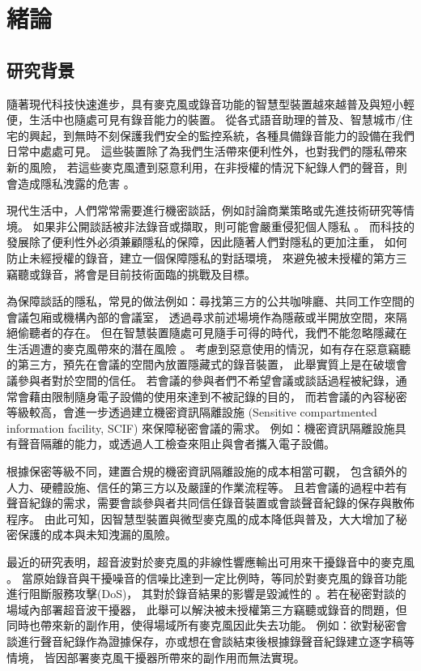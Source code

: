 \chapter{緒論}\label{chapter:intro}

\section{研究背景}\label{section:intro-background}

    隨著現代科技快速進步，具有麥克風或錄音功能的智慧型裝置越來越普及與短小輕便，生活中也隨處可見有錄音能力的裝置。
從各式語音助理的普及、智慧城市/住宅的興起，到無時不刻保護我們安全的監控系統，各種具備錄音能力的設備在我們日常中處處可見。
這些裝置除了為我們生活帶來便利性外，也對我們的隱私帶來新的風險，
若這些麥克風遭到惡意利用，在非授權的情況下紀錄人們的聲音，則會造成隱私洩露的危害 \cite{song2017poster}。

    現代生活中，人們常常需要進行機密談話，例如討論商業策略或先進技術研究等情境。
如果非公開談話被非法錄音或擷取，則可能會嚴重侵犯個人隱私 \cite{chung2017alexa}。
而科技的發展除了便利性外必須兼顧隱私的保障，因此隨著人們對隱私的更加注重，
如何防止未經授權的錄音，建立一個保障隱私的對話環境，
來避免被未授權的第方三竊聽或錄音，將會是目前技術面臨的挑戰及目標。

    為保障談話的隱私，常見的做法例如：尋找第三方的公共咖啡廳、共同工作空間的會議包廂或機構內部的會議室，
透過尋求前述場境作為隱蔽或半開放空間，來隔絕偷聽者的存在。
但在智慧裝置隨處可見隨手可得的時代，我們不能忽略隱藏在生活週遭的麥克風帶來的潛在風險 \cite{mao2020watchdog}。
考慮到惡意使用的情況，如有存在惡意竊聽的第三方，預先在會議的空間內放置隱藏式的錄音裝置，
此舉實質上是在破壞會議參與者對於空間的信任。
若會議的參與者們不希望會議或談話過程被紀錄，通常會藉由限制隨身電子設備的使用來達到不被記錄的目的，
而若會議的內容秘密等級較高，會進一步透過建立機密資訊隔離設施
(Sensitive compartmented information facility, SCIF) 來保障秘密會議的需求。
例如：機密資訊隔離設施具有聲音隔離的能力，或透過人工檢查來阻止與會者攜入電子設備。

    根據保密等級不同，建置合規的機密資訊隔離設施的成本相當可觀，
包含額外的人力、硬體設施、信任的第三方以及嚴謹的作業流程等。
且若會議的過程中若有聲音紀錄的需求，需要會談參與者共同信任錄音裝置或會談聲音紀錄的保存與散佈程序。
由此可知，因智慧型裝置與微型麥克風的成本降低與普及，大大增加了秘密保護的成本與未知洩漏的風險。

    最近的研究表明，超音波對於麥克風的非線性響應輸出可用來干擾錄音中的麥克風 \cite{chen2019understanding}。
當原始錄音與干擾噪音的信噪比達到一定比例時，等同於對麥克風的錄音功能進行阻斷服務攻擊(DoS)，
其對於錄音結果的影響是毀滅性的 \cite{zhang2017dolphinattack}。若在秘密對談的場域內部署超音波干擾器，
此舉可以解決被未授權第三方竊聽或錄音的問題，但同時也帶來新的副作用，使得場域所有麥克風因此失去功能。
例如：欲對秘密會談進行聲音紀錄作為證據保存，亦或想在會談結束後根據錄聲音紀錄建立逐字稿等情境，
皆因部署麥克風干擾器所帶來的副作用而無法實現。

